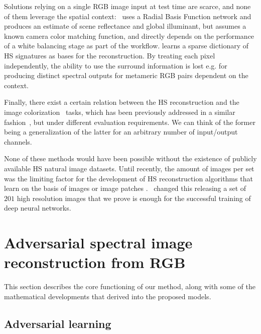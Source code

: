 \documentclass{bmvc2k}
\begin{document}
Solutions relying on a single RGB image input at test time are scarce, and none of them leverage the spatial context:~\cite{nguyen_training-based_2014} uses a Radial Basis Function network and produces an estimate of scene reflectance and global illuminant, but assumes a known camera color matching function, and directly depends on the performance of a white balancing stage as part of the workflow.
\cite{arad_sparse_2016} learns a sparse dictionary of HS signatures as bases for the reconstruction.
By treating each pixel independently, the ability to use the surround information is lost e.g. for producing distinct spectral outputs for metameric RGB pairs dependent on the context. 

Finally, there exist a certain relation between the HS reconstruction and the image colorization~\cite{Cheng_2015_ICCV} tasks, which has been previously addressed in a similar fashion~\cite{zhang_colorful_2016,pix2pix2016}, but under different evaluation requirements.
We can think of the former being a generalization of the latter for an arbitrary number of input/output channels. 

None of these methods would have been possible without the existence of publicly available HS natural image datasets. Until recently, the amount of images per set was the limiting factor for the development of HS reconstruction algorithms that learn on the basis of images or image patches
\cite{foster_frequency_2006,yasuma_generalized_2010,chakrabarti2011statistics,nguyen_training-based_2014,eckhard_outdoor_2015,foster_time-lapse_2016}.~\cite{arad_sparse_2016} changed this releasing a set of $201$ high resolution images that we prove is enough for the successful training of deep neural networks.   

\section{Adversarial spectral image reconstruction from RGB}
\label{sec:adv_rgb2hs}

This section describes the core functioning of our method, along with some of the mathematical developments that derived into the proposed models.
\subsection{Adversarial learning}
\end{document}
